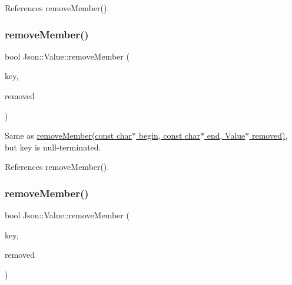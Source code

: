 References remove\+Member().

\mbox{\label{classJson_1_1Value_a708e599489adf30d65bf85a8ee16e6fb_a708e599489adf30d65bf85a8ee16e6fb}} 
\subsubsection{\texorpdfstring{remove\+Member()}{removeMember()}\hspace{0.1cm}{\footnotesize\ttfamily [3/5]}}
{\footnotesize\ttfamily bool Json\+::\+Value\+::remove\+Member (\begin{DoxyParamCaption}\item[{const char $\ast$}]{key,  }\item[{\hyperlink{classJson_1_1Value}{Value} $\ast$}]{removed }\end{DoxyParamCaption})}

Same as \hyperlink{classJson_1_1Value_a49c91af727d6b4eb0af02a81bb2def87_a49c91af727d6b4eb0af02a81bb2def87}{remove\+Member(const char$\ast$ begin, const char$\ast$ end, Value$\ast$ removed)}, but \textquotesingle{}key\textquotesingle{} is null-\/terminated. 

References remove\+Member().

\mbox{\label{classJson_1_1Value_ae385ecef98427970df525ee876e9f54a_ae385ecef98427970df525ee876e9f54a}} 
\subsubsection{\texorpdfstring{remove\+Member()}{removeMember()}\hspace{0.1cm}{\footnotesize\ttfamily [4/5]}}
{\footnotesize\ttfamily bool Json\+::\+Value\+::remove\+Member (\begin{DoxyParamCaption}\item[{\hyperlink{json_8h_a1e723f95759de062585bc4a8fd3fa4be_a1e723f95759de062585bc4a8fd3fa4be}{J\+S\+O\+N\+C\+P\+P\+\_\+\+S\+T\+R\+I\+NG} const \&}]{key,  }\item[{\hyperlink{classJson_1_1Value}{Value} $\ast$}]{removed }\end{DoxyParamCaption})}



